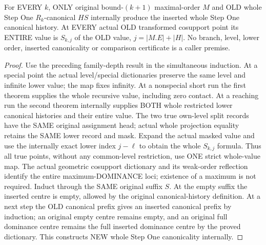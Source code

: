 \begin{theorem}
\label{hir:original-recursive-entire-step-interior-history}
\leanok
For EVERY $k$, ONLY original bound-$(k+1)$ maximal-order $M$ and OLD whole
Step One $R_k$-canonical $HS$ internally produce the inserted whole Step One
canonical history. At EVERY actual OLD transformed cosupport point its ENTIRE
value is $S_{k,j}$ of the OLD value, $j=|M.E|+|H|$. No branch, level, lower
order, inserted canonicality or comparison certificate is a caller premise.
\end{theorem}
\begin{proof}
Use the preceding family-depth result in the simultaneous induction.
At a special point the actual level/special dictionaries preserve the same
level and infinite lower value; the map fixes infinity. At a nonspecial short
run the first theorem supplies the whole recursive value, including zero
contact. At a reaching run the second theorem internally supplies BOTH whole
restricted lower canonical histories and their entire value. The two true
own-level split records have the SAME original assignment head; actual whole
projection equality retains the SAME lower record and mask. Expand the actual
masked value and use the internally exact lower index $j-\ell$ to obtain the
whole $S_{k,j}$ formula. Thus all true points, without any common-level
restriction, use ONE strict whole-value map. The actual geometric cosupport
dictionary and its weak-order reflection identify the entire maximum-DOMINANCE
loci; existence of a maximum is not required. Induct through the SAME original
suffix $S$. At the empty suffix the inserted centre is empty, allowed by the
original canonical-history definition. At a next step the OLD canonical
prefix gives an inserted canonical prefix by induction; an original empty
centre remains empty, and an original full dominance centre remains the full
inserted dominance centre by the proved dictionary. This constructs NEW
whole Step One canonicality internally.
\end{proof}

